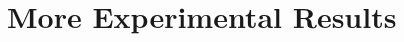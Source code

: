 \documentclass[letterpaper]{article} %
\theoremstyle{plain}
\theoremstyle{definition}
\theoremstyle{remark}
\begin{document}



\section{More Experimental Results}\label{app:more_exp}
\end{document}

